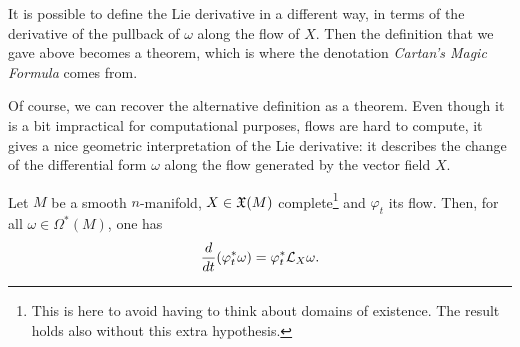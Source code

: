 It is possible to define the Lie derivative in a different way, in terms of the derivative of the pullback of $\omega$ along the flow of $X$.
Then the definition that we gave above becomes a theorem, which is where the denotation \emph{Cartan's Magic Formula} comes from.

Of course, we can recover the alternative definition as a theorem.
Even though it is a bit impractical for computational purposes, flows are hard to compute, it gives a nice geometric interpretation of the Lie derivative: it describes the change of the differential form $\omega$ along the flow generated by the vector field $X$.

\begin{theorem}\label{thm:LieDerivativeFlow}
	Let $M$ be a smooth $n$-manifold, $X\in\mathfrak{X}(M)$ complete\footnote{This is here to avoid having to think about domains of existence. The result holds also without this extra hypothesis.} and $\varphi_t$ its flow.
	Then, for all $\omega\in \Omega^*(M)$, one has
	\begin{equation}\label{eq:LieDerivativeFlow}
		\frac{d}{dt}(\varphi_t^* \omega) = \varphi_t^*\mathcal{L}_X\omega.
	\end{equation}
\end{theorem}
